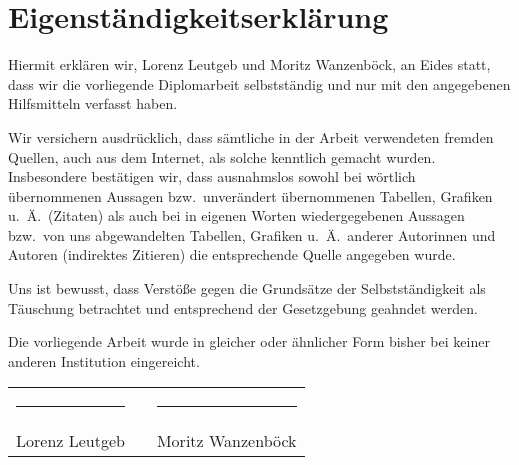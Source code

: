 \vspace*{\fill}
\section*{Eigenständigkeitserklärung}

Hiermit erklären wir, Lorenz Leutgeb und Moritz Wanzenböck, an Eides statt, dass wir die vorliegende Diplomarbeit selbstständig und nur mit den angegebenen Hilfsmitteln verfasst haben.

Wir versichern ausdrücklich, dass sämtliche in der Arbeit verwendeten fremden Quellen, auch aus dem Internet, als solche kenntlich gemacht wurden. Insbesondere bestätigen wir, dass ausnahmslos sowohl bei wörtlich übernommenen Aussagen bzw.\ unverändert übernommenen Tabellen, Grafiken u.~Ä.\ (Zitaten) als auch bei in eigenen Worten wiedergegebenen Aussagen bzw.\ von uns abgewandelten Tabellen, Grafiken u.~Ä.\ anderer Autorinnen und Autoren (indirektes Zitieren) die entsprechende Quelle angegeben wurde.

Uns ist bewusst, dass Verstöße gegen die Grundsätze der Selbstständigkeit als Täuschung betrachtet und entsprechend der Gesetzgebung geahndet werden.

Die vorliegende Arbeit wurde in gleicher oder ähnlicher Form bisher bei keiner anderen Institution eingereicht.

\vspace{3cm}

\begin{center}
\begin{tabular}{ccc}
    \rule{0.4\textwidth}{0.5pt} & \hspace{5mm} & \rule{0.4\textwidth}{0.5pt} \\
    Lorenz Leutgeb & & Moritz Wanzenböck
\end{tabular}
\end{center}
\vspace*{\fill}
